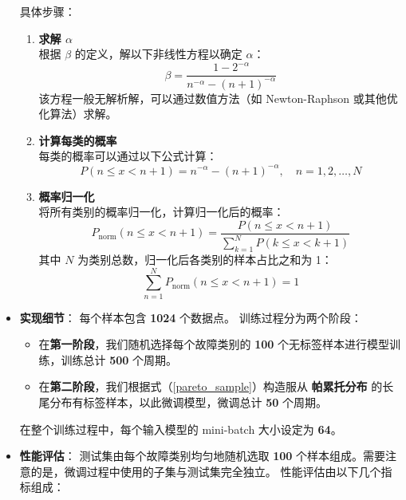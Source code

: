 \documentclass[master]{thesis-uestc}
\begin{document}
\begin{itemize}
    具体步骤：

    \begin{enumerate}
        \item \textbf{求解 $\alpha$} \\
        根据 $\beta$ 的定义，解以下非线性方程以确定 $\alpha$：
        \begin{equation}
        \beta = \frac{1 - 2^{-\alpha}}{n^{-\alpha} - (n+1)^{-\alpha}}
        \end{equation}
        该方程一般无解析解，可以通过数值方法（如 Newton-Raphson 或其他优化算法）求解。

        \item \textbf{计算每类的概率} \\
        每类的概率可以通过以下公式计算：
        \begin{equation}
        P(n \leq x < n+1) = n^{-\alpha} - (n+1)^{-\alpha}, \quad n = 1, 2, \dots, N
        \end{equation}

        \item \textbf{概率归一化} \\
        将所有类别的概率归一化，计算归一化后的概率：
        \begin{equation}
        P_{\text{norm}}(n \leq x < n+1) = \frac{P(n \leq x < n+1)}{\sum_{k=1}^N P(k \leq x < k+1)}
        \label{pareto_sample}
        \end{equation}
        其中 $N$ 为类别总数，归一化后各类别的样本占比之和为 1：
        \begin{equation}
        \sum_{n=1}^N P_{\text{norm}}(n \leq x < n+1) = 1
        \end{equation}
    \end{enumerate}
    \item \textbf{实现细节}：
      每个样本包含 \textbf{1024} 个数据点。
      训练过程分为两个阶段：
      \begin{itemize}
          \item 在\textbf{第一阶段}，我们随机选择每个故障类别的 \textbf{100} 个无标签样本进行模型训练，训练总计 \textbf{500} 个周期。
          \item 在\textbf{第二阶段}，我们根据式（\ref{pareto_sample}）构造服从 \textbf{帕累托分布} 的长尾分布有标签样本，以此微调模型，微调总计 \textbf{50} 个周期。
      \end{itemize}
      在整个训练过程中，每个输入模型的 mini-batch 大小设定为 \textbf{64}。
      
      \item \textbf{性能评估}：  
      测试集由每个故障类别均匀地随机选取 \textbf{100} 个样本组成。需要注意的是，微调过程中使用的子集与测试集完全独立。  
      性能评估由以下几个指标组成：


\end{itemize}
\end{document}
